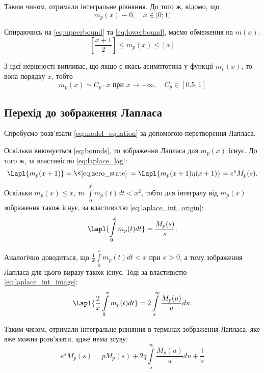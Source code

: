 Таким чином, отримали інтегральне рівняння. До того ж, відомо, що
\begin{equation}
\label{eq:zero_state}
m_{p}(x) \equiv 0, \quad x \in [0; 1)
\end{equation}

Спираючись на \eqref{eq:upperbound} та \eqref{eq:lowerbound}, маємо обмеження на $m(x)$:
\begin{equation}
\label{eq:bounds}
\left[\frac{x+1}{2}\right] \leq m_{p}(x) \leq \left[x\right]
\end{equation}

З цієї нерівності випливає, що якщо є якась асимптотика у функції $m_{p}(x)$, то вона порядку $x$, тобто
\begin{equation}
\label{eq:bounds_inference}
m_{p}(x) \sim C_{p}\cdot x \text{ при } x \rightarrow +\infty, \quad C_{p} \in [0.5; 1]
\end{equation}

\subsection{Перехід до зображення Лапласа}
\label{sec:model_integral_laplace}

Спробуємо розв'язати \eqref{eq:model_equation} за допомогою перетворення Лапласа.

Оскільки виконується \eqref{eq:bounds}, то зображення Лапласа для $m_{p}(x)$ існує. До того ж, за властивістю \eqref{eq:laplace_lag}:
\begin{equation}
\label{eq:model_shifted_laplace}
\Lapl{m_{p}(x+1)}=\<\eqref{eq:zero_state}\>=\Lapl{m_{p}(x+1)\eta(x+1)}=e^s M_{p} (s).
\end{equation}

Оскільки $m_{p}(x) \leq x$, то $\int\limits_0^x m_{p}(t) dt < x^2$, тобто для інтегралу від $m_{p}(x)$ зображення також існує, за властивістю \eqref{eq:laplace_int_origin}:
$$\Lapl{\int\limits_0^x m_p(t) dt} = \frac{M_p(s)}{s}.$$

Аналогічно доводиться, що $\frac{1}{x}\int\limits_0^x m_{p}(t) dt < x$ при $x>0$, а тому зображення Лапласа для цього виразу також існує. Тоді за властивістю \eqref{eq:laplace_int_image}:
$$\Lapl{\frac{2}{x}\int\limits_0^x m_{p}(t) dt} = 2 \int\limits_s^\infty \frac{M_{p}(u)}{u} du.$$

Таким чином, отримали інтегральне рівняння в термінах зображення Лапласа, яке вже можна розв'язати, адже нема зсуву:
\begin{equation}
\label{eq:model_laplace_integral}
e^s M_{p}(s) = p M_{p}(s) + 2q \int\limits_s^\infty \frac{M_{p}(u)}{u} du + \frac{1}{s}
\end{equation}

